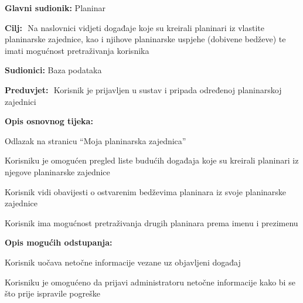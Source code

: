 		\noindent {}
		\begin{packed_item}
			
			\item \textbf{Glavni sudionik: }$ $Planinar$ $
			\item  \textbf{Cilj:} $ $ Na naslovnici vidjeti događaje koje su kreirali planinari iz vlastite planinarske zajednice, kao i njihove planinarske uspjehe (dobivene bedževe) te imati mogućnost pretraživanja korisnika$ $
			\item  \textbf{Sudionici:} $ $Baza podataka $ $
			\item  \textbf{Preduvjet:} $ $ Korisnik je prijavljen u sustav i pripada određenoj planinarskoj zajednici $ $
			\item  \textbf{Opis osnovnog tijeka:}
			
			\item[] \begin{packed_enum}
				
				\item $ $Odlazak na stranicu “Moja planinarska zajednica”$ $
				\item $ $Korisniku je omogućen pregled liste budućih događaja koje su kreirali planinari iz njegove planinarske zajednice$ $
				\item $ $Korisnik vidi obavijesti o ostvarenim bedževima planinara iz svoje planinarske zajednice$ $
				\item $ $Korisnik ima mogućnost pretraživanja drugih planinara prema imenu i prezimenu$ $
			\end{packed_enum}
			
			\item  \textbf{Opis mogućih odstupanja:}
			
			\item[] \begin{packed_item}
				
				\item[2.a] $ $Korisnik uočava netočne informacije vezane uz objavljeni događaj$ $
				\item[] \begin{packed_enum}
					
					\item $ $Korisniku je omogućeno da prijavi administratoru netočne informacije kako bi se što prije ispravile pogreške $ $
					
				\end{packed_enum}
			\end{packed_item}
		\end{packed_item}
	
